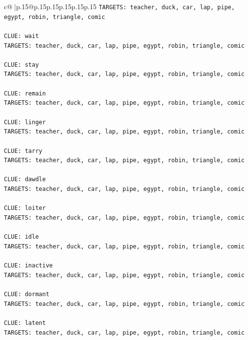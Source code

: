 \documentclass{article}
\begin{document}
{\begin{supertabular}{c@{$\;$}|p{.15\linewidth}@{}p{.15\linewidth}p{.15\linewidth}p{.15\linewidth}p{.15\linewidth}p{.15\linewidth}}
{{{\texttt{TARGETS: teacher, duck, car, lap, pipe, egypt, robin, triangle, comic} \\
\\ 
\texttt{CLUE: wait} \\
\texttt{TARGETS: teacher, duck, car, lap, pipe, egypt, robin, triangle, comic} \\
\\ 
\texttt{CLUE: stay} \\
\texttt{TARGETS: teacher, duck, car, lap, pipe, egypt, robin, triangle, comic} \\
\\ 
\texttt{CLUE: remain} \\
\texttt{TARGETS: teacher, duck, car, lap, pipe, egypt, robin, triangle, comic} \\
\\ 
\texttt{CLUE: linger} \\
\texttt{TARGETS: teacher, duck, car, lap, pipe, egypt, robin, triangle, comic} \\
\\ 
\texttt{CLUE: tarry} \\
\texttt{TARGETS: teacher, duck, car, lap, pipe, egypt, robin, triangle, comic} \\
\\ 
\texttt{CLUE: dawdle} \\
\texttt{TARGETS: teacher, duck, car, lap, pipe, egypt, robin, triangle, comic} \\
\\ 
\texttt{CLUE: loiter} \\
\texttt{TARGETS: teacher, duck, car, lap, pipe, egypt, robin, triangle, comic} \\
\\ 
\texttt{CLUE: idle} \\
\texttt{TARGETS: teacher, duck, car, lap, pipe, egypt, robin, triangle, comic} \\
\\ 
\texttt{CLUE: inactive} \\
\texttt{TARGETS: teacher, duck, car, lap, pipe, egypt, robin, triangle, comic} \\
\\ 
\texttt{CLUE: dormant} \\
\texttt{TARGETS: teacher, duck, car, lap, pipe, egypt, robin, triangle, comic} \\
\\ 
\texttt{CLUE: latent} \\
\texttt{TARGETS: teacher, duck, car, lap, pipe, egypt, robin, triangle, comic} \\
}}}
\end{supertabular}}
\end{document}
